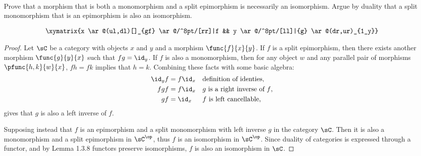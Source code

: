 \documentclass[main.tex]{subfiles}
\begin{document}
\paragraph{}
\begin{exercise}
	Prove that a morphism that is both a monomorphism and a split epimorphism is
	necessarily an isomorphism. Argue by duality that a split monomorphism that
	is an epimorphism is also an isomorphism.
\end{exercise}
	\[\xymatrix{x \ar@(ul,dl)[]_{gf} \ar@/^8pt/[rr]|f && y \ar@/^8pt/[ll]|{g} \ar@(dr,ur)_{1_y}}\]
\begin{proof}
	Let \(\sC\) be a category with objects \(x\) and \(y\) and a morphism
	\(\func{f}{x}{y}\). If \(f\) is a split epimorphism, then there exists
	another morphism \(\func{g}{y}{x}\) such that \(fg=\id_y\). If \(f\) is also
	a monomorphism, then for any object \(w\) and any parallel pair of morphisms
	\(\pfunc{h,k}{w}{x}\), \(fh=fk\) implies that \(h=k\). Combining these facts
	with some basic algebra:
	\begin{align*}
		\id_yf&=f\id_x && \textrm{definition of identies}, \\
		fgf&=f\id_x && \textrm{\(g\) is a right inverse of \(f\)}, \\
		gf&=\id_x && \textrm{\(f\) is left cancellable},
	\end{align*}
	gives that \(g\) is also a left inverse of \(f\).

	Supposing instead that \(f\) is an epimorphism and a split monomorphism with
	left inverse \(g\) in the category \(\sC\). Then it is also a monomorphism
	and a split epimorphism in \(\sC^\op\), thus \(f\) is an isomorphism in
	\(\sC^\op\). Since duality of categories is expressed through a functor, and
	by Lemma 1.3.8 functors preserve isomorphisms, \(f\) is also an isomorphism
	in \(\sC\).
\end{proof}
\end{document}
